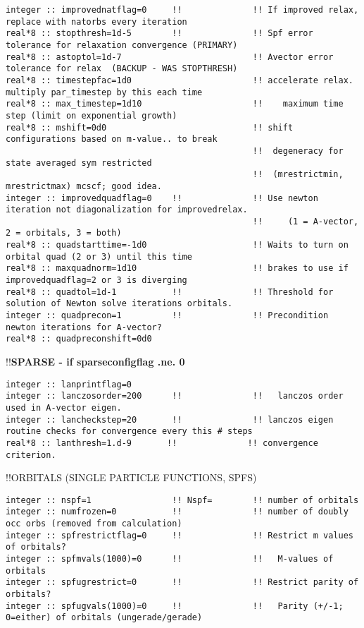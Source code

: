 \begin{verbatim}
integer :: improvednatflag=0     !!              !! If improved relax, replace with natorbs every iteration
real*8 :: stopthresh=1d-5        !!              !! Spf error tolerance for relaxation convergence (PRIMARY)
real*8 :: astoptol=1d-7                          !! Avector error tolerance for relax  (BACKUP - WAS STOPTHRESH)
real*8 :: timestepfac=1d0                        !! accelerate relax. multiply par_timestep by this each time
real*8 :: max_timestep=1d10                      !!    maximum time step (limit on exponential growth)
real*8 :: mshift=0d0                             !! shift configurations based on m-value.. to break 
                                                 !!  degeneracy for state averaged sym restricted
                                                 !!  (mrestrictmin, mrestrictmax) mcscf; good idea.
integer :: improvedquadflag=0    !!              !! Use newton iteration not diagonalization for improvedrelax.
                                                 !!     (1 = A-vector, 2 = orbitals, 3 = both)
real*8 :: quadstarttime=-1d0                     !! Waits to turn on orbital quad (2 or 3) until this time
real*8 :: maxquadnorm=1d10                       !! brakes to use if improvedquadflag=2 or 3 is diverging
real*8 :: quadtol=1d-1           !!              !! Threshold for solution of Newton solve iterations orbitals.
integer :: quadprecon=1          !!              !! Precondition newton iterations for A-vector?
real*8 :: quadpreconshift=0d0
\end{verbatim}
!!\textbf{\qquad SPARSE - if sparseconfigflag .ne. 0}
\begin{verbatim}
integer :: lanprintflag=0
integer :: lanczosorder=200      !!              !!   lanczos order used in A-vector eigen.
integer :: lancheckstep=20       !!              !! lanczos eigen routine checks for convergence every this # steps
real*8 :: lanthresh=1.d-9       !!              !! convergence criterion.
\end{verbatim}
!!{\large \quad ORBITALS (SINGLE PARTICLE FUNCTIONS, SPFS)}
\begin{verbatim}
integer :: nspf=1                !! Nspf=        !! number of orbitals
integer :: numfrozen=0           !!              !! number of doubly occ orbs (removed from calculation)
integer :: spfrestrictflag=0     !!              !! Restrict m values of orbitals?  
integer :: spfmvals(1000)=0      !!              !!   M-values of orbitals 
integer :: spfugrestrict=0       !!              !! Restrict parity of orbitals? 
integer :: spfugvals(1000)=0     !!              !!   Parity (+/-1; 0=either) of orbitals (ungerade/gerade)
\end{verbatim}
